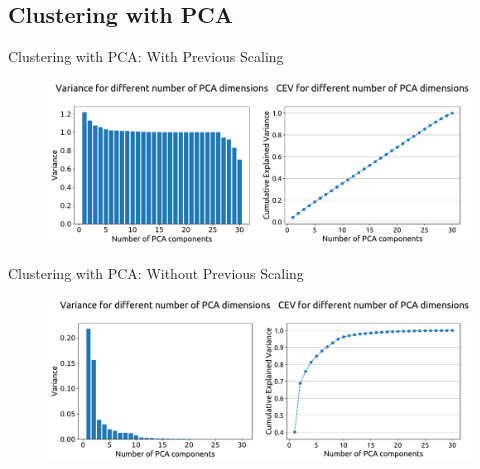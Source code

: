 \documentclass[t,11pt,compress,xcolor=table,hyperref={bookmarks=false}]{beamer}
\begin{document}
\subsection{Clustering with PCA}

\begin{frame}{Clustering with PCA: With Previous Scaling}
\begin{figure}
\hspace*{-0.9cm}\includegraphics[scale=0.35]{figs/PCA_scaled_variance.pdf}
\end{figure}
 \end{frame}

\begin{frame}{Clustering with PCA: Without Previous Scaling}
\begin{figure}
\hspace*{-0.9cm}\includegraphics[scale=0.35]{figs/PCA_not_scaled_variance.pdf}
\end{figure}
 \end{frame}
\end{document}
